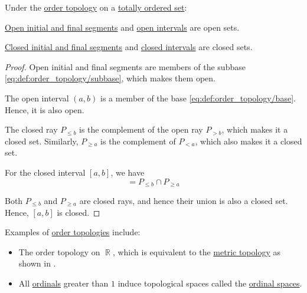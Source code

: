 \begin{proposition}\label{thm:order_topology_intervals}
  Under the \hyperref[def:order_topology]{order topology} on a \hyperref[def:totally_ordered_set]{totally ordered set}:
  \begin{thmenum}
     \hyperref[def:order_interval/unbounded]{Open initial and final segments} and \hyperref[def:order_interval/open]{open intervals} are open sets.

     \hyperref[def:order_interval/unbounded]{Closed initial and final segments} and \hyperref[def:order_interval/closed]{closed intervals} are closed sets.
  \end{thmenum}
\end{proposition}
\begin{proof}
   Open initial and final segments are members of the subbase \eqref{eq:def:order_topology/subbase}, which makes them open.

  The open interval \( (a, b) \) is a member of the base \eqref{eq:def:order_topology/base}. Hence, it is also open.

   The closed ray \( P_{\leq b} \) is the complement of the open ray \( P_{>b} \), which makes it a closed set. Similarly, \( P_{\geq a} \) is the complement of \( P_{<a} \), which also makes it a closed set.

  For the closed interval \( [a, b] \), we have
  \begin{equation*}
    [a, b] = P_{\leq b} \cap P_{\geq a}
  \end{equation*}

  Both \( P_{\leq b} \) and \( P_{\geq a} \) are closed rays, and hence their union is also a closed set. Hence, \( [a, b] \) is closed.
\end{proof}

\begin{example}\label{ex:def:order_topology}
  Examples of \hyperref[def:order_topology]{order topologies} include:
  \begin{itemize}
    \item The order topology on \( \BbbR \), which is equivalent to the \hyperref[def:metric_topology]{metric topology} as shown in .

    \item All \hyperref[def:ordinal]{ordinals} greater than \( 1 \) induce topological spaces called the \hyperref[def:ordinal_space]{ordinal spaces}.
  \end{itemize}
\end{example}

